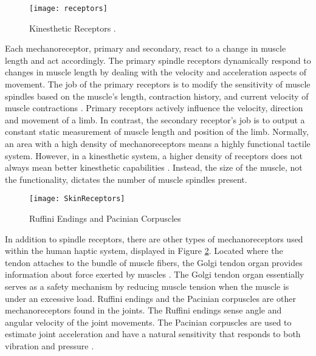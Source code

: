  
 \begin{figure}[h]
 	\centering
 	\texttt{[image: receptors]}
 	\caption{Kinesthetic Receptors \cite{proprioception}.}
 	\label{fig:receptors}
 \end{figure}


 

\par Each mechanoreceptor, primary and secondary, react to a change in muscle length and act accordingly. The primary spindle receptors dynamically respond to changes in muscle length by dealing with the velocity and acceleration aspects of movement. The job of the primary receptors is to modify the sensitivity of muscle spindles based on the muscle's length, contraction history, and current velocity of muscle contractions \cite{mihelj_haptics}. Primary receptors actively influence the velocity, direction and movement of a limb. In contrast, the secondary receptor's job is to output a constant static measurement of muscle length and position of the limb. Normally, an area with a high density of mechanoreceptors  means a highly functional tactile system. However, in a kinesthetic system, a higher density of receptors does not always mean better kinesthetic capabilities \cite{mihelj_haptics}. Instead, the size of the muscle, not the functionality, dictates the number of muscle spindles present. 


 
\begin{figure}[h]
	\centering
	\texttt{[image: SkinReceptors]}
	\caption{Ruffini Endings and Pacinian Corpuscles \cite{somatosensory}}
	\label{fig:SkinReceptors}
\end{figure}


\par In addition to spindle receptors, there are other types of mechanoreceptors used within the human haptic system, displayed in Figure \ref{fig:SkinReceptors}.
Located where the tendon attaches to the bundle of muscle fibers, the Golgi tendon organ provides information about force exerted by muscles \cite{mihelj_haptics}. The Golgi tendon organ essentially serves as a safety mechanism by reducing muscle tension when the muscle is under an excessive load.  Ruffini endings and the Pacinian corpuscles are other mechanoreceptors found in the joints. The Ruffini endings sense angle and angular velocity of the joint movements. The Pacinian corpuscles are used to estimate joint acceleration and have a natural sensitivity that responds to both vibration and pressure \cite{mihelj_haptics}.


